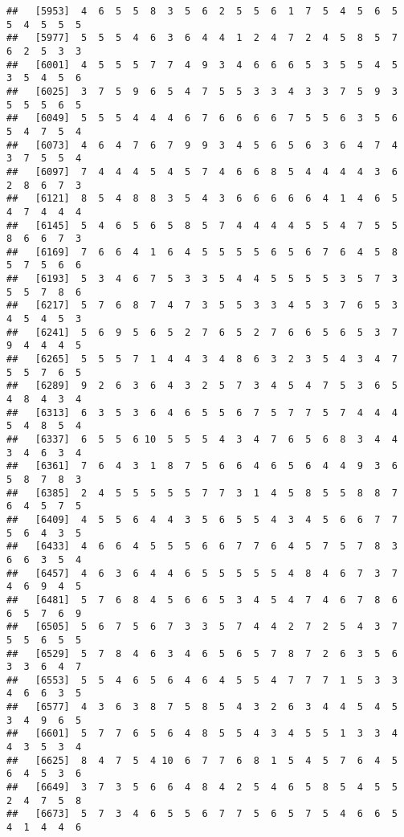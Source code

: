 \documentclass[
]{book}
\begin{document}
\begin{verbatim}
##   [5953]  4  6  5  5  8  3  5  6  2  5  5  6  1  7  5  4  5  6  5  5  4  5  5  5
##   [5977]  5  5  5  4  6  3  6  4  4  1  2  4  7  2  4  5  8  5  7  6  2  5  3  3
##   [6001]  4  5  5  5  7  7  4  9  3  4  6  6  6  5  3  5  5  4  5  3  5  4  5  6
##   [6025]  3  7  5  9  6  5  4  7  5  5  3  3  4  3  3  7  5  9  3  5  5  5  6  5
##   [6049]  5  5  5  4  4  4  6  7  6  6  6  6  7  5  5  6  3  5  6  5  4  7  5  4
##   [6073]  4  6  4  7  6  7  9  9  3  4  5  6  5  6  3  6  4  7  4  3  7  5  5  4
##   [6097]  7  4  4  4  5  4  5  7  4  6  6  8  5  4  4  4  4  3  6  2  8  6  7  3
##   [6121]  8  5  4  8  8  3  5  4  3  6  6  6  6  6  4  1  4  6  5  4  7  4  4  4
##   [6145]  5  4  6  5  6  5  8  5  7  4  4  4  4  5  5  4  7  5  5  8  6  6  7  3
##   [6169]  7  6  6  4  1  6  4  5  5  5  5  6  5  6  7  6  4  5  8  5  7  5  6  6
##   [6193]  5  3  4  6  7  5  3  3  5  4  4  5  5  5  5  3  5  7  3  5  5  7  8  6
##   [6217]  5  7  6  8  7  4  7  3  5  5  3  3  4  5  3  7  6  5  3  4  5  4  5  3
##   [6241]  5  6  9  5  6  5  2  7  6  5  2  7  6  6  5  6  5  3  7  9  4  4  4  5
##   [6265]  5  5  5  7  1  4  4  3  4  8  6  3  2  3  5  4  3  4  7  5  5  7  6  5
##   [6289]  9  2  6  3  6  4  3  2  5  7  3  4  5  4  7  5  3  6  5  4  8  4  3  4
##   [6313]  6  3  5  3  6  4  6  5  5  6  7  5  7  7  5  7  4  4  4  5  4  8  5  4
##   [6337]  6  5  5  6 10  5  5  5  4  3  4  7  6  5  6  8  3  4  4  3  4  6  3  4
##   [6361]  7  6  4  3  1  8  7  5  6  6  4  6  5  6  4  4  9  3  6  5  8  7  8  3
##   [6385]  2  4  5  5  5  5  5  7  7  3  1  4  5  8  5  5  8  8  7  6  4  5  7  5
##   [6409]  4  5  5  6  4  4  3  5  6  5  5  4  3  4  5  6  6  7  7  5  6  4  3  5
##   [6433]  4  6  6  4  5  5  5  6  6  7  7  6  4  5  7  5  7  8  3  6  6  3  5  4
##   [6457]  4  6  3  6  4  4  6  5  5  5  5  5  4  8  4  6  7  3  7  4  6  9  4  5
##   [6481]  5  7  6  8  4  5  6  6  5  3  4  5  4  7  4  6  7  8  6  6  5  7  6  9
##   [6505]  5  6  7  5  6  7  3  3  5  7  4  4  2  7  2  5  4  3  7  5  5  6  5  5
##   [6529]  5  7  8  4  6  3  4  6  5  6  5  7  8  7  2  6  3  5  6  3  3  6  4  7
##   [6553]  5  5  4  6  5  6  4  6  4  5  5  4  7  7  7  1  5  3  3  4  6  6  3  5
##   [6577]  4  3  6  3  8  7  5  8  5  4  3  2  6  3  4  4  5  4  5  3  4  9  6  5
##   [6601]  5  7  7  6  5  6  4  8  5  5  4  3  4  5  5  1  3  3  4  4  3  5  3  4
##   [6625]  8  4  7  5  4 10  6  7  7  6  8  1  5  4  5  7  6  4  5  6  4  5  3  6
##   [6649]  3  7  3  5  6  6  4  8  4  2  5  4  6  5  8  5  4  5  5  2  4  7  5  8
##   [6673]  5  7  3  4  6  5  5  6  7  7  5  6  5  7  5  4  6  6  5  4  1  4  4  6

\end{verbatim}
\end{document}
